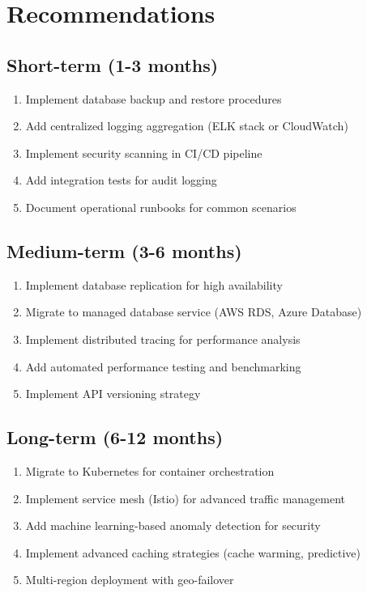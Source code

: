 \documentclass[12pt,oneside,a4paper]{article}
\begin{document}
\newpage

\section{Recommendations}

\subsection{Short-term (1-3 months)}
\begin{enumerate}
    \item Implement database backup and restore procedures
    \item Add centralized logging aggregation (ELK stack or CloudWatch)
    \item Implement security scanning in CI/CD pipeline
    \item Add integration tests for audit logging
    \item Document operational runbooks for common scenarios
\end{enumerate}

\subsection{Medium-term (3-6 months)}
\begin{enumerate}
    \item Implement database replication for high availability
    \item Migrate to managed database service (AWS RDS, Azure Database)
    \item Implement distributed tracing for performance analysis
    \item Add automated performance testing and benchmarking
    \item Implement API versioning strategy
\end{enumerate}

\subsection{Long-term (6-12 months)}
\begin{enumerate}
    \item Migrate to Kubernetes for container orchestration
    \item Implement service mesh (Istio) for advanced traffic management
    \item Add machine learning-based anomaly detection for security
    \item Implement advanced caching strategies (cache warming, predictive)
    \item Multi-region deployment with geo-failover
\end{enumerate}
\end{document}
